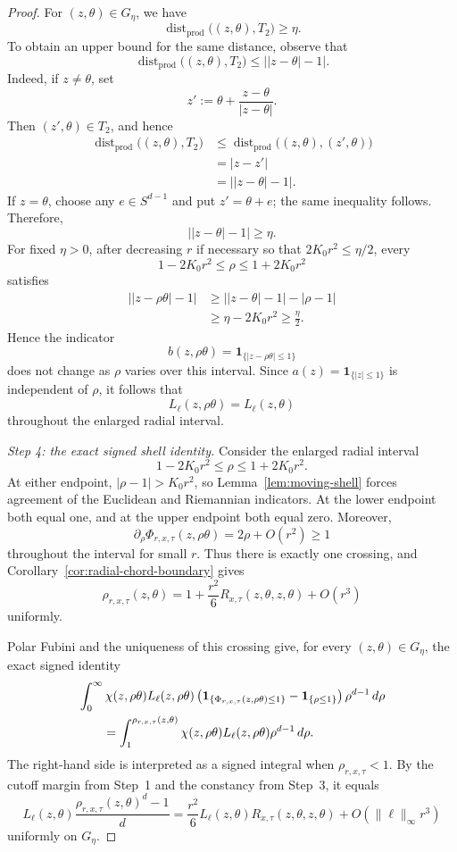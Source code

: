 \documentclass[11pt]{article}
\theoremstyle{remark}
\newcommand{\ind}{\mathbf 1}
\numberwithin{equation}{section}
\begin{document}
\begin{proof}
For $(z,\theta)\in G_\eta$, we have
\[
\operatorname{dist}_{\mathrm{prod}}
\bigl((z,\theta),T_2\bigr)\ge\eta.
\]
To obtain an upper bound for the same distance, observe that
\[
\operatorname{dist}_{\mathrm{prod}}
\bigl((z,\theta),T_2\bigr)
\le \bigl||z-\theta|-1\bigr|.
\]
Indeed, if $z\ne\theta$, set
\[
z'
:=
\theta+\frac{z-\theta}{|z-\theta|}.
\]
Then $(z',\theta)\in T_2$, and hence
\[
\begin{aligned}
\operatorname{dist}_{\mathrm{prod}}
\bigl((z,\theta),T_2\bigr)
&\le
\operatorname{dist}_{\mathrm{prod}}
\bigl((z,\theta),(z',\theta)\bigr)\\
&=
|z-z'|\\
&=
\bigl||z-\theta|-1\bigr|.
\end{aligned}
\]
If $z=\theta$, choose any $e\in S^{d-1}$ and put $z'=\theta+e$;
the same inequality follows.  Therefore,
\[
\bigl||z-\theta|-1\bigr|\ge\eta.
\]
For fixed $\eta>0$, after decreasing $r$ if necessary so that
$2K_0r^2\le\eta/2$, every
\[
1-2K_0r^2\le\rho\le1+2K_0r^2
\]
satisfies
\[
\begin{aligned}
\bigl||z-\rho\theta|-1\bigr|
&\ge
\bigl||z-\theta|-1\bigr|-|\rho-1|\\
&\ge
\eta-2K_0r^2
\ge \frac{\eta}{2}.
\end{aligned}
\]
Hence the indicator
\[
b(z,\rho\theta)=\ind_{\{|z-\rho\theta|\le1\}}
\]
does not change as $\rho$ varies over this interval.  Since
$a(z)=\ind_{\{|z|\le1\}}$ is independent of $\rho$, it follows that
\[
L_\ell(z,\rho\theta)=L_\ell(z,\theta)
\]
throughout the enlarged radial interval.

\emph{Step 4: the exact signed shell identity.}
Consider the enlarged radial interval
\[
1-2K_0r^2\le\rho\le1+2K_0r^2.
\]
At either endpoint, $|\rho-1|>K_0r^2$, so
Lemma~\ref{lem:moving-shell} forces agreement of the Euclidean and Riemannian
indicators.  At the lower endpoint both equal one, and at the upper endpoint
both equal zero.  Moreover,
\[
\partial_\rho\Phi_{r,x,\tau}(z,\rho\theta)=2\rho+O(r^2)\ge1
\]
throughout the interval for small $r$.  Thus there is exactly one crossing,
and Corollary~\ref{cor:radial-chord-boundary} gives
\[
\rho_{r,x,\tau}(z,\theta)
=1+\frac{r^2}{6}R_{x,\tau}(z,\theta,z,\theta)+O(r^3)
\]
uniformly.

Polar Fubini and the uniqueness of this crossing give, for every
$(z,\theta)\in G_\eta$, the exact signed identity
\begin{align}
&\int_0^\infty \chi(z,\rho\theta)L_\ell(z,\rho\theta)
\left(\ind_{\{\Phi_{r,x,\tau}(z,\rho\theta)\le1\}}
      -\ind_{\{\rho\le1\}}\right)\rho^{d-1}\,d\rho
\notag\\
&\qquad=
\int_1^{\rho_{r,x,\tau}(z,\theta)}
\chi(z,\rho\theta)L_\ell(z,\rho\theta)\rho^{d-1}\,d\rho.
\label{eq:exact-signed-shell}
\end{align}
The right-hand side is interpreted as a signed integral when
$\rho_{r,x,\tau}<1$.  By the cutoff margin from Step~1 and the constancy from
Step~3, it equals
\[
L_\ell(z,\theta)
\frac{\rho_{r,x,\tau}(z,\theta)^d-1}{d}
=\frac{r^2}{6}L_\ell(z,\theta)
R_{x,\tau}(z,\theta,z,\theta)+O(\|\ell\|_\infty r^3)
\]
uniformly on $G_\eta$.


\end{proof}
\end{document}
